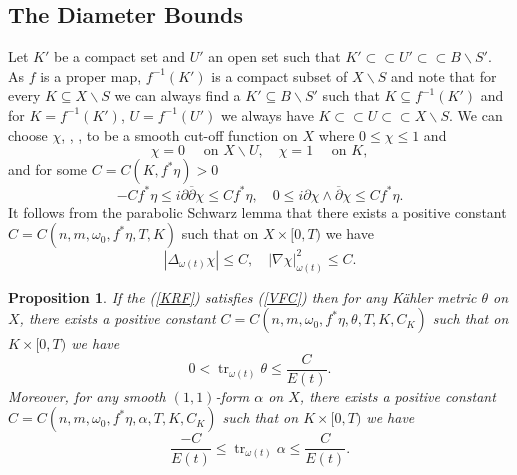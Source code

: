 \documentclass[12pt]{article}
\newtheorem{proposition}[theorem]{Proposition}
\numberwithin{equation}{section}
\renewcommand{\d}{\partial}
\newcommand{\dbar}{\overline{\partial}}
\DeclareMathOperator{\tr}{tr}
\begin{document}
\subsection{The Diameter Bounds}

\noindent Let  $K'$ be a compact set and $U'$ an open set such that $K' \subset \subset U' \subset \subset B\backslash S'$. As $f$ is a proper map, $f^{-1}(K')$ is a compact subset of $ X\backslash S$ and note that for every $K \subseteq X \backslash S$ we can always find a $K' \subseteq B \backslash S'$ such that $K \subseteq f^{-1}(K')$ and for $K = f^{-1}(K')$, $U = f^{-1}(U')$ we always have $K \subset \subset U \subset \subset X \backslash S$. We can choose $\chi$, \cite[Lem. 4.2]{J20}, \cite{T10}, to be a smooth cut-off function on $X$ where $0 \leq \chi \leq 1$ and
\begin{equation*}
    \chi = 0 \quad \text{ on } X\backslash U, \quad \chi = 1 \quad \text{ on } K,
\end{equation*}
and for some $C = C(K,f^*\eta) > 0$
\begin{equation*}
    -C f^*\eta \leq i\d\dbar \chi \leq C f^*\eta, \quad 0 \leq i\d \chi \wedge \dbar \chi \leq C f^*\eta.
\end{equation*}
It follows from the parabolic Schwarz lemma that there exists a positive constant $C = C(n,m,\omega_0,f^*\eta,T,K)$ such that on $X \times [0, T)$ we have
\begin{equation*}
    |\Delta_{\omega(t)} \chi | \leq C, \quad |\nabla \chi|_{\omega(t)}^2 \leq C.
\end{equation*}

\begin{proposition}\label{trace_lemma}
If the (\ref{KRF}) satisfies (\ref{VFC}) then for any K\"ahler metric $\theta$ on $X$, there exists a positive constant $C  = C(n,m,\omega_0,f^*\eta,\theta,T,K, C_K)$ such that on $K \times [0,T)$ we have
\begin{equation*}
    0 < \tr_{\omega(t)} \theta \leq \frac{C}{E(t)}.
\end{equation*}
Moreover, for any smooth $(1,1)$-form $\alpha$ on $X$, there exists a positive constant $C = C(n,m,\omega_0, f^*\eta, \alpha, T, K, C_K)$ such that on $K \times [0,T)$ we have
\begin{equation*}
    \frac{-C}{E(t)} \leq \tr_{\omega(t)} \alpha \leq \frac{C}{E(t)}.
\end{equation*}
\end{proposition}
\end{document}
